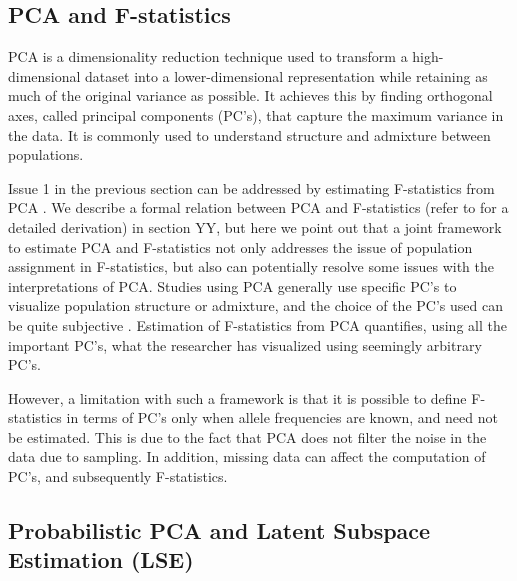\documentclass[12pt, letterpaper]{article}
\begin{document}
\subsection{PCA and F-statistics}

PCA is a dimensionality reduction technique used to transform a high-dimensional dataset into a lower-dimensional representation while retaining as much of the original variance as possible. It achieves this by finding orthogonal axes, called principal components (PC's), that capture the maximum variance in the data. It is commonly used to understand structure and admixture between populations. 

Issue 1 in the previous section can be addressed by estimating F-statistics from PCA \cite{peter_geometric_2022}. We describe a formal relation between PCA and F-statistics (refer to \cite{peter_geometric_2022} for a detailed derivation) in section YY, but here we point out that a joint framework to estimate PCA and F-statistics not only addresses the issue of population assignment in F-statistics, but also can potentially resolve some issues with the interpretations of PCA. Studies using PCA generally use specific PC's to visualize population structure or admixture, and the choice of the PC's used can be quite subjective \cite{elhaik_principal_2022}. Estimation of F-statistics from PCA quantifies, using all the important PC's, what the researcher has visualized using seemingly arbitrary PC's.

However, a limitation with such a framework is that it is possible to define F-statistics in terms of PC's only when allele frequencies are known, and need not be estimated. This is due to the fact that PCA does not filter the noise in the data due to sampling. In addition, missing data can affect the computation of PC's, and subsequently F-statistics.

\subsection{Probabilistic PCA and Latent Subspace Estimation (LSE)}
\end{document}
